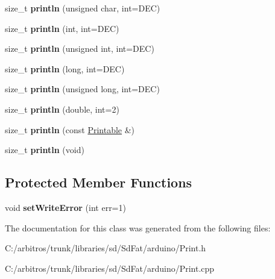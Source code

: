 \begin{DoxyCompactItemize}
\item 
\hypertarget{class_print_a0fb229c37a731c53ded8e9e832b4a0a6}{size\-\_\-t {\bfseries println} (unsigned char, int=D\-E\-C)}\label{class_print_a0fb229c37a731c53ded8e9e832b4a0a6}

\item 
\hypertarget{class_print_a058fbcd23e761e3d2fbe06bb1a07b737}{size\-\_\-t {\bfseries println} (int, int=D\-E\-C)}\label{class_print_a058fbcd23e761e3d2fbe06bb1a07b737}

\item 
\hypertarget{class_print_ac63f5e2c9a519af617af8880a4912ea7}{size\-\_\-t {\bfseries println} (unsigned int, int=D\-E\-C)}\label{class_print_ac63f5e2c9a519af617af8880a4912ea7}

\item 
\hypertarget{class_print_a173af0cd520b7105bcb2d63ab79d246f}{size\-\_\-t {\bfseries println} (long, int=D\-E\-C)}\label{class_print_a173af0cd520b7105bcb2d63ab79d246f}

\item 
\hypertarget{class_print_a74c918137834a92d0b82537e90d02ed5}{size\-\_\-t {\bfseries println} (unsigned long, int=D\-E\-C)}\label{class_print_a74c918137834a92d0b82537e90d02ed5}

\item 
\hypertarget{class_print_a2864f4a5017f1e2e2b8e46a8d185aab0}{size\-\_\-t {\bfseries println} (double, int=2)}\label{class_print_a2864f4a5017f1e2e2b8e46a8d185aab0}

\item 
\hypertarget{class_print_aec2662333be402d9f95f7e2a8bbf7202}{size\-\_\-t {\bfseries println} (const \hyperlink{class_printable}{Printable} \&)}\label{class_print_aec2662333be402d9f95f7e2a8bbf7202}

\item 
\hypertarget{class_print_a7a21cd59cb8deef99051130e7852e382}{size\-\_\-t {\bfseries println} (void)}\label{class_print_a7a21cd59cb8deef99051130e7852e382}

\end{DoxyCompactItemize}
\subsection*{Protected Member Functions}
\begin{DoxyCompactItemize}
\item 
\hypertarget{class_print_ae0b8de12769dcf4c9b1fd3e67b3b7552}{void {\bfseries set\-Write\-Error} (int err=1)}\label{class_print_ae0b8de12769dcf4c9b1fd3e67b3b7552}

\end{DoxyCompactItemize}


The documentation for this class was generated from the following files\-:\begin{DoxyCompactItemize}
\item 
C\-:/arbitros/trunk/libraries/sd/\-Sd\-Fat/arduino/Print.\-h\item 
C\-:/arbitros/trunk/libraries/sd/\-Sd\-Fat/arduino/Print.\-cpp\end{DoxyCompactItemize}
